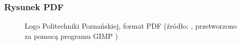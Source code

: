 \subsubsection{Rysunek PDF}

 \begin{figure}[ht]
 \centering
  \caption{Logo Politechniki Poznańskiej, format PDF (źródło: \cite{noauthor_materialy_nodate}, przetworzono za pomocą programu GIMP \cite{noauthor_gimp_nodate})}
  \label{fig:logoPP-PDF}
\end{figure}
